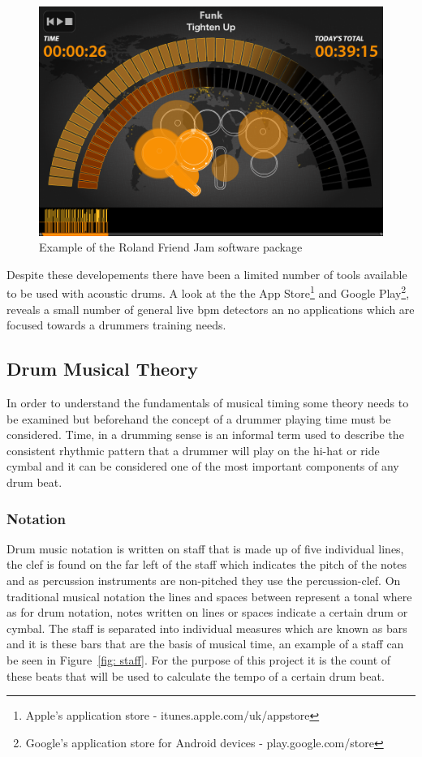\documentclass[a4paper, 11pt]{article}
\begin{document}
\begin{figure}[htbp]
\centering
\includegraphics[scale=0.175]{images/friendjam.png}
\caption{Example of the Roland Friend Jam software package}
\label{fig: friendjam}
\end{figure}

Despite these developements there have been a limited number of tools available to be used with acoustic drums. A look at the the App Store\footnote{Apple's application store - itunes.apple.com/uk/appstore‎} and Google Play\footnote{Google's application store for Android devices - play.google.com/store}, reveals a small number of general live bpm detectors an no applications which are focused towards a drummers training needs.\par

\subsection{Drum Musical Theory}
In order to understand the fundamentals of musical timing some theory needs to be examined but beforehand the concept of a drummer playing time must be considered. Time, in a drumming sense is an informal term used to describe the consistent rhythmic pattern that a drummer will play on the hi-hat or ride cymbal \cite{drum-bible} and it can be considered one of the most important components of any drum beat. 

\subsubsection{Notation}
Drum music notation is written on staff that is made up of five individual lines, the clef is found on the far left of the staff which indicates the pitch of the notes \cite{oxford-comp} and as percussion instruments are non-pitched they use the percussion-clef. On traditional musical notation the lines and spaces between represent a tonal where as for drum notation, notes written on lines or spaces indicate a certain drum or cymbal. The staff is separated into individual measures which are known as bars \cite{drum-note} and it is these bars that are the basis of musical time, an example of a staff can be seen in Figure~\ref{fig: staff}. For the purpose of this project it is the count of these beats that will be used to calculate the tempo of a certain drum beat.
\end{document}
